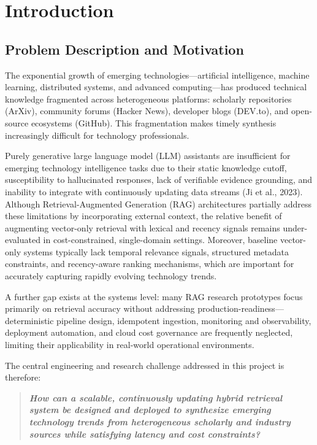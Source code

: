 \chapter{Introduction}

\section{Problem Description and Motivation}
\label{sec:problem}

The exponential growth of emerging technologies---artificial intelligence, machine learning, distributed systems, and advanced computing---has produced technical knowledge fragmented across heterogeneous platforms: scholarly repositories (ArXiv), community forums (Hacker News), developer blogs (DEV.to), and open-source ecosystems (GitHub). This fragmentation makes timely synthesis increasingly difficult for technology professionals.

Purely generative large language model (LLM) assistants are insufficient for emerging technology intelligence tasks due to their static knowledge cutoff, susceptibility to hallucinated responses, lack of verifiable evidence grounding, and inability to integrate with continuously updating data streams (Ji et al., 2023). Although Retrieval-Augmented Generation (RAG) architectures partially address these limitations by incorporating external context, the relative benefit of augmenting vector-only retrieval with lexical and recency signals remains under-evaluated in cost-constrained, single-domain settings. Moreover, baseline vector-only systems typically lack temporal relevance signals, structured metadata constraints, and recency-aware ranking mechanisms, which are important for accurately capturing rapidly evolving technology trends.

A further gap exists at the systems level: many RAG research prototypes focus primarily on retrieval accuracy without addressing production-readiness---deterministic pipeline design, idempotent ingestion, monitoring and observability, deployment automation, and cloud cost governance are frequently neglected, limiting their applicability in real-world operational environments.

The central engineering and research challenge addressed in this project is therefore:

\begin{quote}
\textbf{\textit{How can a scalable, continuously updating hybrid retrieval system be designed and deployed to synthesize emerging technology trends from heterogeneous scholarly and industry sources while satisfying latency and cost constraints?}}
\end{quote}

